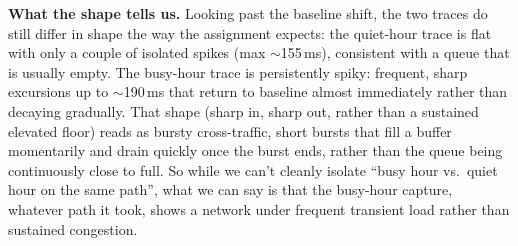 \textbf{What the shape tells us.} Looking past the baseline shift, the two traces do still differ
in shape the way the assignment expects: the quiet-hour trace is flat with only a couple of
isolated spikes (max $\sim$155\,ms), consistent with a queue that is usually empty. The busy-hour
trace is persistently spiky: frequent, sharp excursions up to $\sim$190\,ms that return to
baseline almost immediately rather than decaying gradually. That shape (sharp in, sharp out,
rather than a sustained elevated floor) reads as bursty cross-traffic, short bursts that fill a
buffer momentarily and drain quickly once the burst ends, rather than the queue being
continuously close to full. So while we can't cleanly isolate ``busy hour vs.\ quiet hour on the
same path'', what we can say is that the busy-hour capture, whatever path it took, shows a
network under frequent transient load rather than sustained congestion.
